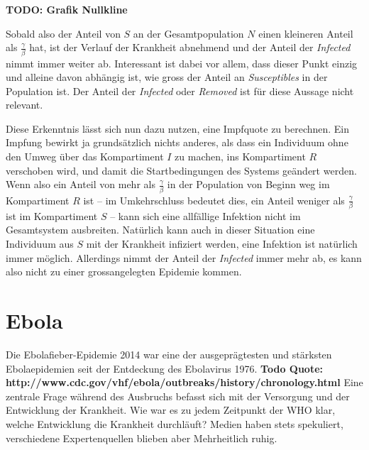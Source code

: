 \begin{refsection}
\textbf{TODO: Grafik Nullkline}

Sobald also der Anteil von $S$ an der Gesamtpopulation $N$ einen kleineren Anteil als $\frac{\gamma}{\beta}$ hat, ist der Verlauf der Krankheit abnehmend und der Anteil der \emph{Infected} nimmt immer weiter ab.
Interessant ist dabei vor allem, dass dieser Punkt einzig und alleine davon abhängig ist, wie gross der Anteil an \emph{Susceptibles} in der Population ist. 
Der Anteil der \emph{Infected} oder \emph{Removed} ist für diese Aussage nicht relevant. 

Diese Erkenntnis lässt sich nun dazu nutzen, eine Impfquote zu berechnen. 
Ein Impfung bewirkt ja grundsätzlich nichts anderes, als dass ein Individuum ohne den Umweg über das Kompartiment $I$ zu machen, ins Kompartiment $R$ verschoben wird, und damit die Startbedingungen des Systems geändert werden.
Wenn also ein Anteil von mehr als $\frac{\gamma}{\beta}$ in der Population von Beginn weg im Kompartiment $R$ ist -- im Umkehrschluss bedeutet dies, ein Anteil weniger als $\frac{\gamma}{\beta}$ ist im Kompartiment $S$ -- kann sich eine allfällige Infektion nicht im Gesamtsystem ausbreiten.
Natürlich kann auch in dieser Situation eine Individuum aus $S$ mit der Krankheit infiziert werden, eine Infektion ist natürlich immer möglich. 
Allerdings nimmt der Anteil der \emph{Infected} immer mehr ab, es kann also nicht zu einer grossangelegten Epidemie kommen.

\section{Ebola}
Die Ebolafieber-Epidemie 2014  war eine der ausgeprägtesten und stärksten Ebolaepidemien seit der Entdeckung des Ebolavirus 1976. \textbf{Todo Quote: http://www.cdc.gov/vhf/ebola/outbreaks/history/chronology.html} Eine zentrale Frage während des Ausbruchs befasst sich mit der Versorgung und der Entwicklung der Krankheit. Wie war es zu jedem Zeitpunkt der WHO klar, welche Entwicklung die Krankheit durchläuft? Medien haben stets spekuliert, verschiedene Expertenquellen blieben aber Mehrheitlich ruhig. \\


\end{refsection}
